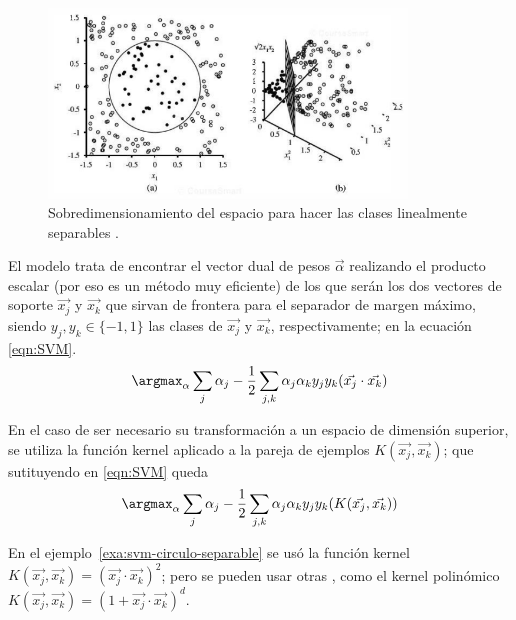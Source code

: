 \begin{figure}[htbp]
\centering
\includegraphics[width=0.85\textwidth]{svm-circulo-separable}
\caption[Sobredimensionamiento del espacio para hacer las clases linealmente separables]{Sobredimensionamiento del espacio para hacer las clases linealmente separables \citep{Russell2009}.}
\label{fig:svm-circulo-separable}
\end{figure}

El modelo trata de encontrar el vector dual de pesos $\vec{\alpha}$ realizando el producto escalar (por eso es un método muy eficiente) de los que serán los dos vectores de soporte $\vec{x_j}$ y $\vec{x_k}$ que sirvan de frontera para el separador de margen máximo, siendo $y_j, y_k \in \{-1, 1\}$ las clases de $\vec{x_j}$ y $\vec{x_k}$, respectivamente; en la ecuación \eqref{eqn:SVM}.
\begin{equation}
\argmax_\alpha \sum_j \alpha_j - \frac{1}{2} \sum_{j,k}\alpha_j \alpha_k y_j y_k (\vec{x_j} \cdot \vec{x_k})
\label{eqn:SVM}
\end{equation}

En el caso de ser necesario su transformación a un espacio de dimensión superior, se utiliza la función kernel aplicado a la pareja de ejemplos $K(\vec{x_j}, \vec{x_k})$; que sutituyendo en \eqref{eqn:SVM} queda
\begin{equation}
\argmax_\alpha \sum_j \alpha_j - \frac{1}{2} \sum_{j,k}\alpha_j \alpha_k y_j y_k (K(\vec{x_j},\vec{x_k}))
\label{eqn:SVM-kerneled}
\end{equation}

En el ejemplo~\ref{exa:svm-circulo-separable} se usó la función kernel $K(\vec{x_j},\vec{x_k})=(\vec{x_j}\cdot\vec{x_k})^2$; pero se pueden usar otras \citep{Russell2009}, como el kernel polinómico $K(\vec{x_j},\vec{x_k})=(1+\vec{x_j}\cdot\vec{x_k})^d$.
